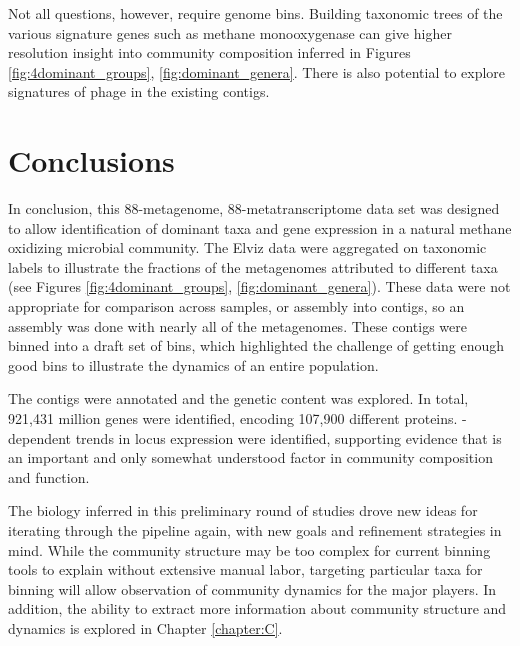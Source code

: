 Not all questions, however, require genome bins.
Building taxonomic trees of the various signature genes such as methane monooxygenase can give higher resolution insight into community composition inferred in Figures \ref{fig:4dominant_groups}, \ref{fig:dominant_genera}.
There is also potential to explore signatures of phage in the existing contigs.


\section{Conclusions}

In conclusion, this 88-metagenome, 88-metatranscriptome data set was designed to allow identification of dominant taxa and gene expression in a natural methane oxidizing microbial community.
The Elviz data were aggregated on taxonomic labels to illustrate the fractions of the metagenomes attributed to different taxa (see Figures \ref{fig:4dominant_groups}, \ref{fig:dominant_genera}).
These data were not appropriate for comparison across samples, or assembly into contigs, so an assembly was done with nearly all of the metagenomes.
These contigs were binned into a draft set of bins, which highlighted the challenge of getting enough good bins to illustrate the dynamics of an entire population.

The contigs were annotated and the genetic content was explored.
In total, 921,431 million genes were identified, encoding 107,900 different proteins.
-dependent trends in locus expression were identified, supporting evidence that  is an important and only somewhat understood factor in community composition and function.

The biology inferred in this preliminary round of studies drove new ideas for iterating through the pipeline again, with new goals and refinement strategies in mind.
While the community structure may be too complex for current binning tools to explain without extensive manual labor, targeting particular taxa for binning will allow observation of community dynamics for the major players.
In addition, the ability to extract more information about community structure and dynamics is explored in Chapter \ref{chapter:C}.



